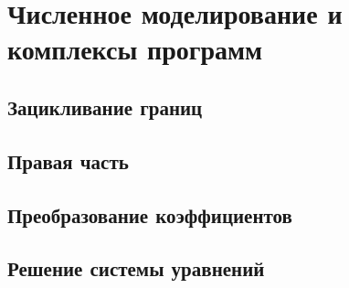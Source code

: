 \chapter{Численное моделирование и комплексы программ}\label{ch:ch2}

\section{Зацикливание границ}\label{sec:ch2/sec1}



\section{Правая часть}\label{sec:ch2/sec2}

\section{Преобразование коэффициентов}\label{sec:ch2/sec3}

\section{Решение системы уравнений}\label{sec:ch2/sec4}

\clearpage
